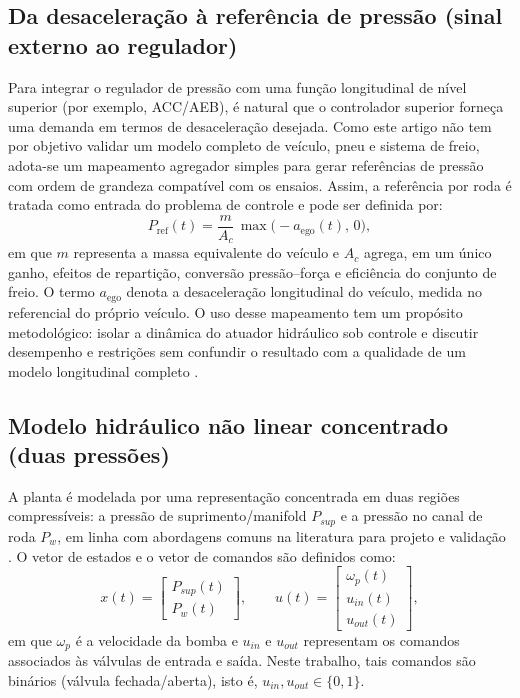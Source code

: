 \documentclass[a4paper]{ifacconf}
\begin{document}
\subsection{Da desaceleração à referência de pressão (sinal externo ao regulador)}
Para integrar o regulador de pressão com uma função longitudinal de nível superior (por exemplo, ACC/AEB), é natural que o controlador superior forneça uma demanda em termos de desaceleração desejada. Como este artigo não tem por objetivo validar um modelo completo de veículo, pneu e sistema de freio, adota-se um mapeamento agregador simples para gerar referências de pressão com ordem de grandeza compatível com os ensaios. Assim, a referência por roda é tratada como entrada do problema de controle e pode ser definida por:
\begin{equation}
   P_{\mathrm{ref}}(t) = \frac{m}{A_c}\,\max\big(-a_{\mathrm{ego}}(t),\,0\big),
   \label{eq:aref_to_pref}
\end{equation}
em que $m$ representa a massa equivalente do veículo e $A_c$ agrega, em um único ganho, efeitos de repartição, conversão pressão--força e eficiência do conjunto de freio. O termo $a_{\mathrm{ego}}$ denota a desaceleração longitudinal do veículo, medida no referencial do próprio veículo. O uso desse mapeamento tem um propósito metodológico: isolar a dinâmica do atuador hidráulico sob controle e discutir desempenho e restrições sem confundir o resultado com a qualidade de um modelo longitudinal completo \cite{Lentin2022}.

\subsection{Modelo hidráulico não linear concentrado (duas pressões)}
A planta é modelada por uma representação concentrada em duas regiões compressíveis: a pressão de suprimento/manifold $P_{sup}$ e a pressão no canal de roda $P_w$, em linha com abordagens comuns na literatura para projeto e validação \cite{HouhuaJing2022,Lv2014,ZengYangHuang2023}. O vetor de estados e o vetor de comandos são definidos como:
\begin{equation}
   x(t)=\begin{bmatrix} P_{sup}(t) \\ P_w(t) \end{bmatrix},
   \qquad
   u(t)=\begin{bmatrix} \omega_p(t) \\ u_{in}(t) \\ u_{out}(t) \end{bmatrix},
   \label{eq:states_inputs}
\end{equation}
em que $\omega_p$ é a velocidade da bomba e $u_{in}$ e $u_{out}$ representam os comandos associados às válvulas de entrada e saída. Neste trabalho, tais comandos são binários (válvula fechada/aberta), isto é, $u_{in},u_{out}\in\{0,1\}$.
\end{document}
